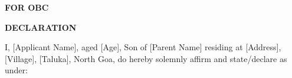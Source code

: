 \documentclass[10pt, a4paper]{article}
\begin{document}
\vspace*{-1cm} 

\begin{center}
    \textbf{\Large FOR OBC}
\end{center}

\begin{center}
    \textbf{\Large DECLARATION}
\end{center}


\begin{flushleft}
\end{flushleft}

\vspace{0.5cm} %

I, [Applicant Name], aged [Age], Son of [Parent Name] residing at [Address], [Village], [Taluka], North Goa, do hereby solemnly affirm and state/declare as under:
\end{document}
